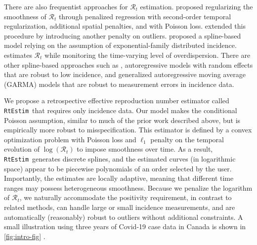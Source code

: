 \documentclass[10pt,letterpaper]{article}
\def\RtEstim{\texttt{RtEstim}}
\def\calR{\mathcal{R}}
\newcommand{\citep}[1]{\cite{#1}}
\begin{document}
There are also frequentist approaches for $\calR_t$ estimation.
\cite{abry2020spatial} proposed regularizing the smoothness of $\calR_t$ through
penalized regression with second-order temporal regularization, additional
spatial penalties, and with Poisson loss. \cite{pascal2022nonsmooth} extended
this procedure by introducing another penalty on outliers.
\cite{pircalabelu2023spline} proposed a spline-based model relying on the
assumption of exponential-family distributed incidence. \cite{ho2023accounting}
estimates $\calR_t$ while monitoring the time-varying level of overdispersion.
There are other spline-based approaches such as
\cite{azmon2014estimation,gressani2021approximate}, autoregressive models with
random effects \citep{jin2023epimix} that are robust to low incidence, and
generalized autoregressive moving average (GARMA) models
\citep{hettinger2023estimating} that are robust to measurement errors in
incidence data. 


We propose a retrospective effective reproduction number estimator
called \RtEstim\ that requires only incidence data. Our model makes the
conditional Poisson assumption, similar to much of the prior work described
above, but is empirically more robust to misspecification. This estimator is 
defined by a convex optimization problem with Poisson loss and $\ell_1$ penalty 
on the temporal evolution of $\log(\calR_t)$ to impose smoothness over time. 
As a result, \RtEstim\ generates discrete splines, and the estimated curves (in
logarithmic space) appear to be piecewise polynomials of an order selected by the
user. Importantly, the estimates are locally adaptive, meaning that different
time ranges may possess heterogeneous smoothness. Because we penalize the
logarithm of $\calR_t$, we naturally accommodate the positivity requirement, in
contrast to related methods, can
handle large or small incidence measurements, and are automatically (reasonably)
robust to outliers without additional constraints. A small illustration using
three years of Covid-19 case data in Canada is shown in \autoref{fig:intro-fig} 
\citep{CovidTimelineCanada}.
\end{document}
